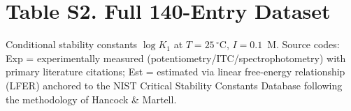 \documentclass[journal=jacsat,manuscript=suppinfo]{achemso}
\begin{document}
\newpage

\section*{Table S2. Full 140-Entry Dataset}
\label{tab:s2}

Conditional stability constants $\log K_1$ at $T = 25\,^\circ$C, $I = 0.1$~M.
Source codes: Exp = experimentally measured (potentiometry/ITC/spectrophotometry)
with primary literature citations; Est = estimated via linear free-energy
relationship (LFER) anchored to the NIST Critical Stability Constants
Database\cite{MartellSmith2004} following the methodology of
Hancock \& Martell.\cite{Hancock1989}
\end{document}
